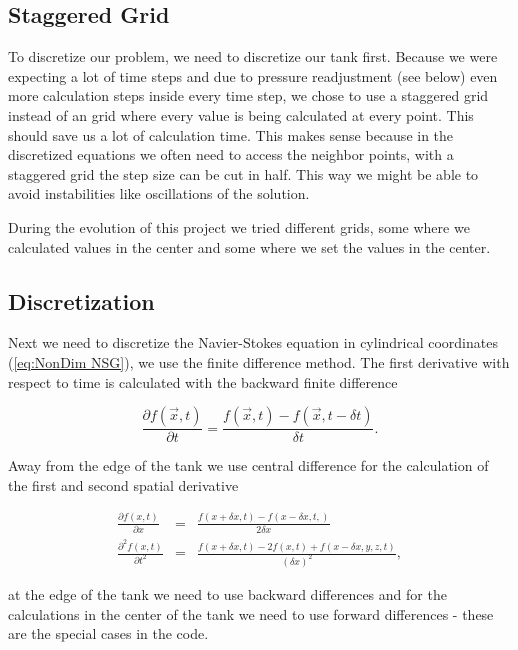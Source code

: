 \documentclass[12pt, a4paper, twoside]{article}
\begin{document}
	\subsection{Staggered Grid}
		To discretize our problem, we need to discretize our tank first. Because we were expecting a lot of time steps and due to pressure readjustment (see below) even more calculation steps inside every time step, we chose to use a staggered grid instead of an grid where every value is being calculated at every point. This should save us a lot of calculation time. This makes sense because in the discretized equations we often need to access the neighbor points, with a staggered grid the step size can be cut in half. This way we might be able to avoid instabilities like oscillations of the solution. 
		
		During the evolution of this project we tried different grids, some where we calculated values in the center and some where we set the values in the center. %
		
		
	\subsection{Discretization}
		Next we need to discretize the Navier-Stokes equation in cylindrical coordinates (\ref{eq:NonDim NSG}), we use the finite difference method. The first derivative with respect to time is calculated with the backward finite difference
		
		\begin{equation}
			\frac{\partial f(\vec{x}, t)}{\partial t} = \frac{f(\vec{x},t) - f(\vec{x}, t - \delta t)}{\delta t} .
			\label{eq:BackDiv Time}
		\end{equation}
		
		Away from the edge of the tank we use central difference for the calculation of the first and second spatial derivative %
		
		\begin{eqnarray}
			\frac{\partial f(x,t)}{\partial x} &=& \frac{f(x + \delta x,t) - f(x - \delta x,t,)}{2\delta x}
			\label{eq:CentrDiv Space}
			\\
			\frac{\partial^2 f(x,t)}{\partial t^2} &=& \frac{f(x+\delta x,t) - 2f(x,t) + f(x - \delta x,y,z,t)}{\left(\delta x\right)^2} ,
			\label{eq:2CentrDiv Space}
		\end{eqnarray}
		
		at the edge of the tank we need to use backward differences and for the calculations in the center of the tank we need to use forward differences - these are the special cases in the code.
		
\end{document}
